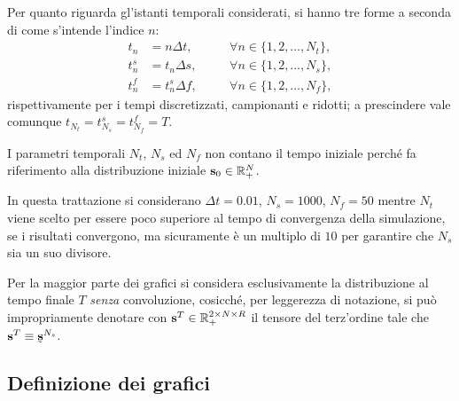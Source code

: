             Per quanto riguarda gl'istanti temporali considerati, si hanno tre forme a seconda di come s'intende l'indice \(n\):
            \begin{equation*}
                \newcommand\hsep{\hspace{1em}}
                \begin{aligned}
                    t_n&=n\Delta t,&\hsep&\forall n\in\{1,2,\ldots,N_t\},\\
                    t^s_n&=t_n\Delta s,&\hsep&\forall n\in\{1,2,\ldots,N_s\},\\
                    t^f_n&=t^s_n\Delta f,&\hsep&\forall n\in\{1,2,\ldots,N_f\},
                \end{aligned}
            \end{equation*}
            rispettivamente per i tempi discretizzati, campionanti e ridotti; a prescindere vale comunque \(t_{N_t}=t^s_{N_s}=t^f_{N_f}=T\).

            \begin{oss}
                I parametri temporali \(N_t\), \(N_s\) ed \(N_f\) non contano il tempo iniziale perché fa riferimento alla distribuzione iniziale \(\mathbf s_0\in\mathbb R_+^N\).
            \end{oss}

            \begin{ipo}
                In questa trattazione si considerano \(\Delta t=0.01\), \(N_s=1000\), \(N_f=50\) mentre \(N_t\) viene scelto per essere poco superiore al tempo di convergenza della simulazione, se i risultati convergono, ma sicuramente è un multiplo di \(10\) per garantire che \(N_s\) sia un suo divisore.
            \end{ipo}

            \begin{oss}
                Per la maggior parte dei grafici si considera esclusivamente la distribuzione al tempo finale \(T\) \textit{senza} convoluzione, cosicché,  per leggerezza di notazione, si può impropriamente denotare con \(\mathbf s^T\in\mathbb R_+^{2\times N\times R}\) il tensore del terz'ordine tale che \(\mathbf s^T\equiv\undertilde{\mathbf s}^{N_s}\).
            \end{oss}

        \subsection{Definizione dei grafici}\label{secDefinizioneGrafici}

